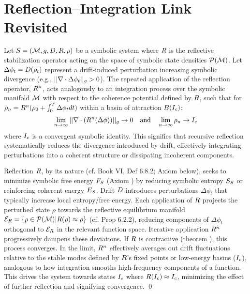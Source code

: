 \section{Reflection–Integration Link Revisited}
\label{sec:bk7_reflection_integration_link_revisited}
\begin{lemma}
\label{lemma:bk7_reflective_integration_lemma___formalized}
Let \(S = (\mathcal{M}, g, D, R, \rho)\) be a symbolic system where \(R\) is the reflective stabilization operator acting on the space of symbolic state densities \(\mathcal{P}(\mathcal{M})\). Let \(\Delta \phi_t = D(\rho_t)\) represent a drift-induced perturbation increasing symbolic divergence (e.g., \(||\nabla \cdot \Delta \phi_t||_g > 0\)). The repeated application of the reflection operator, \(R^n\), acts analogously to an integration process over the symbolic manifold \(\mathcal{M}\) with respect to the coherence potential defined by \(R\), such that for \(\rho_n = R^n(\rho_0 + \int_0^T \Delta \phi_t dt)\) within a basin of attraction \(B(I_c)\):
\[
\lim_{n\to\infty} ||\nabla \cdot (R^n(\Delta \phi))||_g \to 0 \quad \text{and} \quad \lim_{n\to\infty} \rho_n \to I_c
\]
where \(I_c\) is a convergent symbolic identity. This signifies that recursive reflection systematically reduces the divergence introduced by drift, effectively integrating perturbations into a coherent structure or dissipating incoherent components.
\end{lemma}
\begin{demonstratio}
\label{demonstratio:bk7_reflective_averaging_free_energy}
Reflection \(R\), by its nature (cf. Book VI, Def 6.8.2; Axiom  below), seeks to minimize symbolic free energy \(F_S\) (Axiom ) by reducing symbolic entropy \(S_S\) or reinforcing coherent energy \(E_S\). Drift \(D\) introduces perturbations \(\Delta \phi_t\) that typically increase local entropy/free energy. Each application of \(R\) projects the perturbed state \(\rho\) towards the reflective equilibrium manifold \(\mathcal{E}_R = \{\rho \in \mathcal{P}(\mathcal{M}) | R(\rho) \approx \rho \}\) (cf. Prop 6.2.2), reducing components of \(\Delta \phi_t\) orthogonal to \(\mathcal{E}_R\) in the relevant function space. Iterative application \(R^n\) progressively dampens these deviations. If \(R\) is contractive (theorem ), this process converges. In the limit, \(R^n\) effectively averages out drift fluctuations relative to the stable modes defined by \(R\)'s fixed points or low-energy basins (\(I_c\)), analogous to how integration smooths high-frequency components of a function. This drives the system towards states \(I_c\) where \(R(I_c) \approx I_c\), minimizing the effect of further reflection and signifying convergence. \qed {}
\end{demonstratio}
